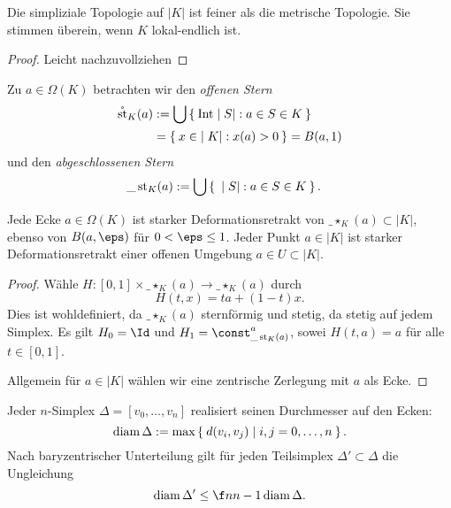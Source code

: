 \begin{st} \label{st:simplicial_topology_subset_topology_locally_finite}
	Die simpliziale Topologie auf $|K|$ ist feiner als die metrische Topologie.
	Sie stimmen überein, wenn $K$ lokal-endlich ist.
	\begin{proof}
		Leicht nachzuvollziehen
	\end{proof}
\end{st}

\begin{df}
	Zu $a \in \Omega(K)$ betrachten wir den \emph{offenen Stern}
	\begin{align*}
		\mathring {\operatorname{st}}_K(a)
		&:= \bigcup \Set{  \operatorname{Int} |S| : a \in S \in K } \\
		&= \Set{ x \in |K| : x(a) > 0 }
		= B(a, 1)
	\end{align*}
	und den \emph{abgeschlossenen Stern}
	\begin{align*}
		\_\operatorname{st}_K(a)
		&:= \bigcup \Set{ |S| : a \in S \in K }.
	\end{align*}
\end{df}

\begin{st}
	Jede Ecke $a \in \Omega(K)$ ist starker Deformationsretrakt von $\_\star_K(a) \subset |K|$, ebenso von $B(a, \eps)$ für $0 < \eps \le 1$.
	Jeder Punkt $a \in |K|$ ist starker Deformationsretrakt einer offenen Umgebung $a \in U \subset |K|$.
	\begin{proof}
		Wähle $H: [0,1] \times \_\star_K(a) \to \_\star_K(a)$ durch
		\[
			H(t, x) = ta + (1-t) x.
		\]
		Dies ist wohldefiniert, da $\_\star_K(a)$ sternförmig und stetig, da stetig auf jedem Simplex.
		Es gilt $H_0 = \Id$ und $H_1 = \const_{\_\star_K(a)}^a$, sowei $H(t,a) = a$ für alle $t \in [0,1]$.

		Allgemein für $a \in |K|$ wählen wir eine zentrische Zerlegung mit $a$ als Ecke.
	\end{proof}
\end{st}

\begin{lem}
	Jeder $n$-Simplex $\Delta = [v_0, \dotsc, v_n]$ realisiert seinen Durchmesser auf den Ecken:
	\[
		\operatorname{diam} \Delta := \max \Set{ d(v_i, v_j) | i,j = 0, \dotsc, n }.
	\]
	Nach baryzentrischer Unterteilung gilt für jeden Teilsimplex $\Delta' \subset \Delta$ die Ungleichung
	\[
		\diam \Delta' \le \f n{n-1} \diam \Delta.
	\]
\end{lem}

